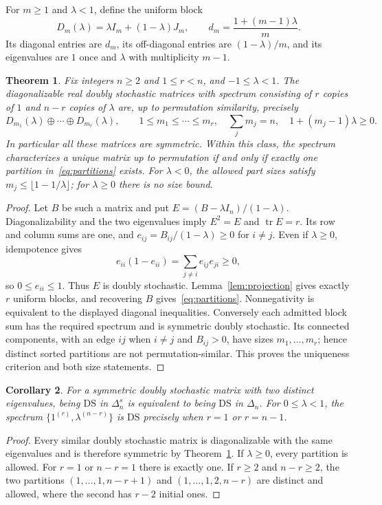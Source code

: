 \documentclass[11pt]{article}
\newtheorem{theorem}{Theorem}
\newtheorem{corollary}[theorem]{Corollary}
\newcommand{\DS}{\mathrm{DS}}
\newcommand{\Del}{\Delta}
\newcommand{\tr}{\operatorname{tr}}
\begin{document}
For $m\geq1$ and $\lambda<1$, define the uniform block
\[
 D_m(\lambda)=\lambda I_m+(1-\lambda)J_m,
 \qquad d_m=\frac{1+(m-1)\lambda}{m}.
\]
Its diagonal entries are $d_m$, its off-diagonal entries are $(1-\lambda)/m$, and its eigenvalues are $1$ once and $\lambda$ with multiplicity $m-1$.

\begin{theorem}\label{thm:partitions}
Fix integers $n\geq2$ and $1\leq r<n$, and $-1\leq\lambda<1$.
The diagonalizable real doubly stochastic matrices with spectrum consisting of $r$ copies of $1$ and $n-r$ copies of $\lambda$ are, up to permutation similarity, precisely
\begin{equation}\label{eq:partitions}
 D_{m_1}(\lambda)\oplus\cdots\oplus D_{m_r}(\lambda),\qquad
 1\leq m_1\leq\cdots\leq m_r,\quad
 \sum_jm_j=n,\quad 1+(m_j-1)\lambda\geq0.
\end{equation}
In particular all these matrices are symmetric. Within this class, the spectrum characterizes a unique matrix up to permutation if and only if exactly one partition in~\eqref{eq:partitions} exists.
For $\lambda<0$, the allowed part sizes satisfy $m_j\leq\lfloor1-1/\lambda\rfloor$; for $\lambda\geq0$ there is no size bound.
\end{theorem}
\begin{proof}
Let $B$ be such a matrix and put $E=(B-\lambda I_n)/(1-\lambda)$.
Diagonalizability and the two eigenvalues imply $E^2=E$ and $\tr E=r$.
Its row and column sums are one, and $e_{ij}=B_{ij}/(1-\lambda)\geq0$ for $i\ne j$.
Even if $\lambda\geq0$, idempotence gives
\[
 e_{ii}(1-e_{ii})=\sum_{j\ne i}e_{ij}e_{ji}\geq0,
\]
so $0\leq e_{ii}\leq1$. Thus $E$ is doubly stochastic.
Lemma~\ref{lem:projection} gives exactly $r$ uniform blocks, and recovering $B$ gives~\eqref{eq:partitions}.
Nonnegativity is equivalent to the displayed diagonal inequalities.
Conversely each admitted block sum has the required spectrum and is symmetric doubly stochastic.
Its connected components, with an edge $ij$ when $i\ne j$ and $B_{ij}>0$, have sizes $m_1,\ldots,m_r$; hence distinct sorted partitions are not permutation-similar.
This proves the uniqueness criterion and both size statements.
\end{proof}

\begin{corollary}\label{cor:converse}
For a symmetric doubly stochastic matrix with two distinct eigenvalues, being $\DS$ in $\Del_n^s$ is equivalent to being $\DS$ in $\Del_n$.
For $0\leq\lambda<1$, the spectrum $\{1^{(r)},\lambda^{(n-r)}\}$ is $\DS$ precisely when $r=1$ or $r=n-1$.
\end{corollary}
\begin{proof}
Every similar doubly stochastic matrix is diagonalizable with the same eigenvalues and is therefore symmetric by Theorem~\ref{thm:partitions}.
If $\lambda\geq0$, every partition is allowed.
For $r=1$ or $n-r=1$ there is exactly one. If $r\geq2$ and $n-r\geq2$, the two partitions
$(1,\ldots,1,n-r+1)$ and $(1,\ldots,1,2,n-r)$ are distinct and allowed, where the second has $r-2$ initial ones.
\end{proof}
\end{document}
